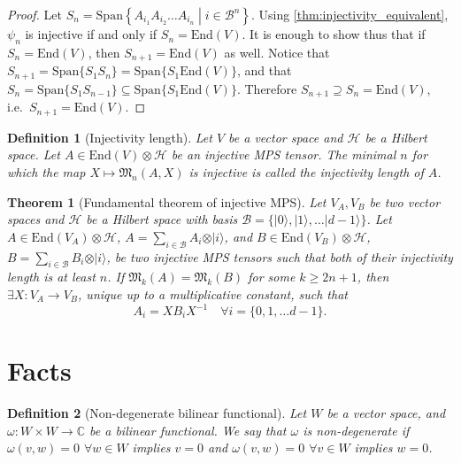 \documentclass{article}
\newtheorem{theorem}{Theorem}
\newtheorem{definition}{Definition}
\newcommand{\End}{\mathrm{End}}
\newcommand{\ket}[1]{\vert #1 \rangle}
\newcommand{\Span}{\mathrm{Span}}
\begin{document}
\begin{proof}
  Let $S_n = \Span\left\{A_{i_1} A_{i_2} \dots A_{i_n} \middle| i\in \mathcal{B}^n \right\}$. Using \cref{thm:injectivity_equivalent}, $\psi_n$ is injective if and only if $S_n = \End(V)$. It is enough to show thus that if $S_n = \End(V)$, then $S_{n+1} = \End(V)$ as well. Notice that $S_{n+1} = \Span\{S_1 S_n\} = \Span\{ S_1 \End(V)\}$, and that $S_{n} = \Span\{S_1 S_{n-1}\} \subseteq \Span\{S_1 \End(V)\}$. Therefore $S_{n+1} \supseteq S_n = \End(V)$, i.e.\ $S_{n+1} = \End(V)$. 
\end{proof}

\begin{definition}[Injectivity length]
    Let $V$ be a vector space and $\mathcal{H}$ be a Hilbert space. Let $A\in \End(V)\otimes \mathcal{H}$ be an \emph{injective} MPS tensor. The minimal $n$ for which the map $X\mapsto \mathfrak{M}_n(A,X)$ is injective is called the \emph{injectivity length} of $A$.
\end{definition}


\begin{theorem}[Fundamental theorem of injective MPS]
    Let $V_A, V_B$ be two vector spaces and $\mathcal{H}$ be a Hilbert space with basis $\mathcal{B} = \{\ket{0},\ket{1},\dots \ket{d-1}\}$. Let $A\in \End(V_A)\otimes \mathcal{H}$, $A = \sum_{i\in \mathcal{B}} A_i \otimes \ket{i}$, and $B\in \End(V_B)\otimes \mathcal{H}$, $B = \sum_{i\in \mathcal{B}} B_i \otimes \ket{i}$, be two injective MPS tensors such that both of their injectivity length is at least $n$. If $\mathfrak{M}_k(A) = \mathfrak{M}_k(B)$ for some $k\geq 2n+1$,  then $\exists X: V_A \rightarrow V_B$, unique up to a multiplicative constant, such that 
    \begin{equation*}
       A_i = X B_i X^{-1} \quad \forall i = \{0,1,\dots d-1\}.
    \end{equation*}
\end{theorem}

\appendix

\section{Facts}

\begin{definition}[Non-degenerate bilinear functional]\label{def:nondegen_bili_fcnl}
  Let $W$ be a vector space, and $\omega: W\times W\to \mathbb{C}$ be a bilinear functional.
  We say that $\omega$ is non-degenerate if $\omega(v,w) = 0$ $\forall w\in W$ implies $v=0$ and $\omega(v,w) = 0$ $\forall v\in W$ implies $w=0$.
\end{definition}
\end{document}
